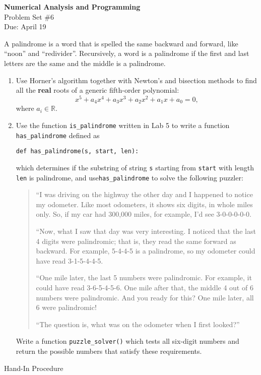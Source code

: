 \documentclass[12pt]{article}
\begin{document}
\begin{center}
\Large
\textbf{Numerical Analysis and Programming}\\
\large
Problem Set \#6\\
Due: April 19
\end{center}
A palindrome is a word that is spelled the same backward and
forward, like ``noon'' and ``redivider''.  Recursively, a word
is a palindrome if the first and last letters are the same
and the middle is a palindrome. 

\begin{enumerate} 
\item Use Horner's algorithm together with Newton's and bisection methods  to find all  the \textbf{real} roots of a generic fifth-order polynomial:
\[
x^5+a_4x^4+a_3x^3+a_2x^2+a_1x+a_0=0,
\]
where $a_i\in \mathbb{R}$.

\item Use the function \verb"is_palindrome" written in Lab 5 to write a function \verb"has_palindrome" defined as 
\begin{verbatim}
def has_palindrome(s, start, len):
\end{verbatim}
which determines if the  substring of string \verb!s! starting from \verb!start! with length \verb!len! is palindrome, and  use\verb"has_palindrome" to solve the following puzzler:
\begin{quote}
``I was driving on the highway the other day and I happened to
notice my odometer. Like most odometers, it shows six digits,
in whole miles only. So, if my car had 300,000
miles, for example, I'd see 3-0-0-0-0-0.

``Now, what I saw that day was very interesting. I noticed that the
last 4 digits were palindromic; that is, they read the same forward as
backward. For example, 5-4-4-5 is a palindrome, so my odometer
could have read 3-1-5-4-4-5.

``One mile later, the last 5 numbers were palindromic. For example, it
could have read 3-6-5-4-5-6.  One mile after that, the middle 4 out of
6 numbers were palindromic.  And you ready for this? One mile later,
all 6 were palindromic!

``The question is, what was on the odometer when I first looked?''
\end{quote}
Write a function \verb!puzzle_solver()! which  tests all six-digit numbers and return the possible numbers that satisfy these requirements.
\end{enumerate} 
\newpage
Hand-In Procedure  
\end{document}
